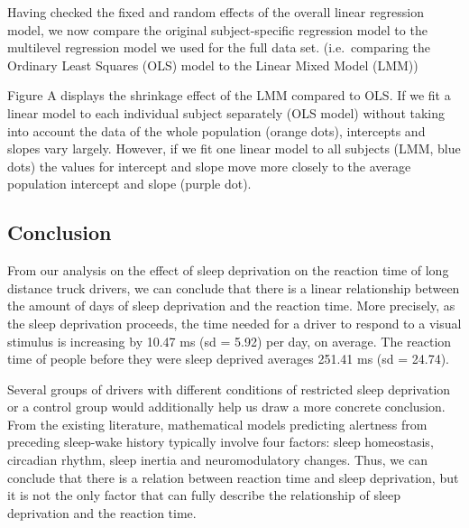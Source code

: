 \documentclass[
]{article}
\begin{document}
Having checked the fixed and random effects of the overall linear
regression model, we now compare the original subject-specific
regression model to the multilevel regression model we used for the full
data set. (i.e.~comparing the Ordinary Least Squares (OLS) model to the
Linear Mixed Model (LMM))

Figure A displays the shrinkage effect of the LMM compared to OLS. If we
fit a linear model to each individual subject separately (OLS model)
without taking into account the data of the whole population (orange
dots), intercepts and slopes vary largely. However, if we fit one linear
model to all subjects (LMM, blue dots) the values for intercept and
slope move more closely to the average population intercept and slope
(purple dot).

\hypertarget{conclusion}{%
\subsection{Conclusion}\label{conclusion}}

From our analysis on the effect of sleep deprivation on the reaction
time of long distance truck drivers, we can conclude that there is a
linear relationship between the amount of days of sleep deprivation and
the reaction time. More precisely, as the sleep deprivation proceeds,
the time needed for a driver to respond to a visual stimulus is
increasing by 10.47 ms (sd = 5.92) per day, on average. The reaction
time of people before they were sleep deprived averages 251.41 ms (sd =
24.74).

Several groups of drivers with different conditions of restricted sleep
deprivation or a control group would additionally help us draw a more
concrete conclusion. From the existing literature, mathematical models
predicting alertness from preceding sleep-wake history typically involve
four factors: sleep homeostasis, circadian rhythm, sleep inertia and
neuromodulatory changes. Thus, we can conclude that there is a relation
between reaction time and sleep deprivation, but it is not the only
factor that can fully describe the relationship of sleep deprivation and
the reaction time.
\end{document}
